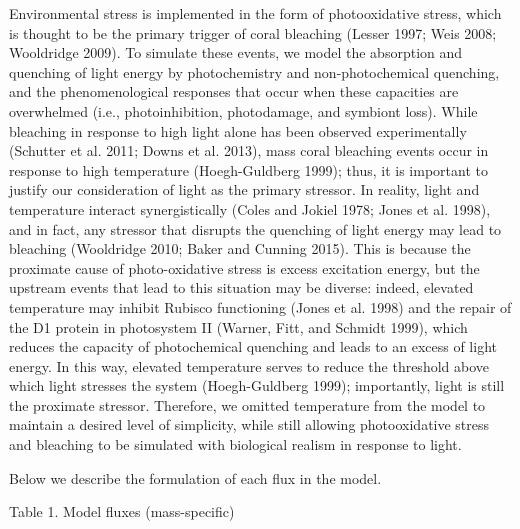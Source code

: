 \documentclass[]{elsarticle} %
\begin{document}
Environmental stress is implemented in the form of photooxidative
stress, which is thought to be the primary trigger of coral bleaching
(Lesser 1997; Weis 2008; Wooldridge 2009). To simulate these events, we
model the absorption and quenching of light energy by photochemistry and
non-photochemical quenching, and the phenomenological responses that
occur when these capacities are overwhelmed (i.e., photoinhibition,
photodamage, and symbiont loss). While bleaching in response to high
light alone has been observed experimentally (Schutter et al. 2011;
Downs et al. 2013), mass coral bleaching events occur in response to
high temperature (Hoegh-Guldberg 1999); thus, it is important to justify
our consideration of light as the primary stressor. In reality, light
and temperature interact synergistically (Coles and Jokiel 1978; Jones
et al. 1998), and in fact, any stressor that disrupts the quenching of
light energy may lead to bleaching (Wooldridge 2010; Baker and Cunning
2015). This is because the proximate cause of photo-oxidative stress is
excess excitation energy, but the upstream events that lead to this
situation may be diverse: indeed, elevated temperature may inhibit
Rubisco functioning (Jones et al. 1998) and the repair of the D1 protein
in photosystem II (Warner, Fitt, and Schmidt 1999), which reduces the
capacity of photochemical quenching and leads to an excess of light
energy. In this way, elevated temperature serves to reduce the threshold
above which light stresses the system (Hoegh-Guldberg 1999);
importantly, light is still the proximate stressor. Therefore, we
omitted temperature from the model to maintain a desired level of
simplicity, while still allowing photooxidative stress and bleaching to
be simulated with biological realism in response to light.

Below we describe the formulation of each flux in the model.

Table 1. Model fluxes (mass-specific)
\end{document}
